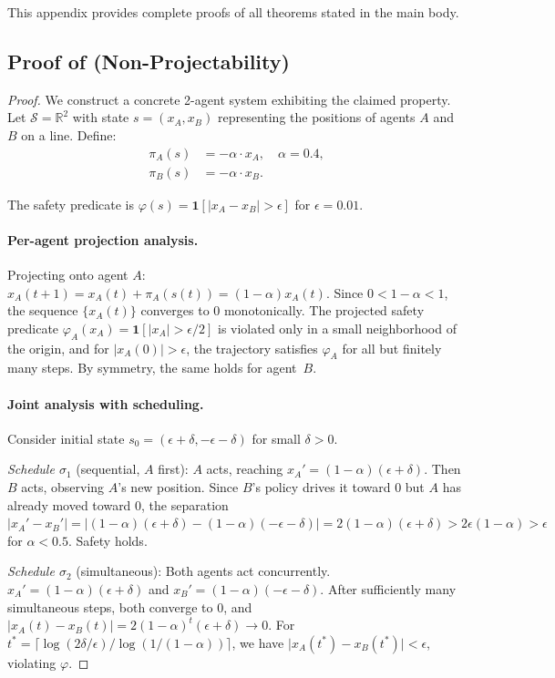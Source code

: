 \documentclass[11pt]{article}
\newcommand{\R}{\mathbb{R}}
\newcommand{\calS}{\mathcal{S}}
\newcommand{\abs}[1]{\lvert #1 \rvert}
\begin{document}
This appendix provides complete proofs of all theorems stated in the
main body.

\subsection{Proof of \texorpdfstring{}{Theorem 2.1} (Non-Projectability)}

\begin{proof}
We construct a concrete 2-agent system exhibiting the claimed property.
Let $\calS = \R^2$ with state $s = (x_A, x_B)$ representing the positions
of agents $A$ and $B$ on a line. Define:
\begin{align}
  \pi_A(s) &= -\alpha \cdot x_A, \quad \alpha = 0.4, \\
  \pi_B(s) &= -\alpha \cdot x_B.
\end{align}

The safety predicate is $\varphi(s) = \mathbf{1}[\abs{x_A - x_B} > \epsilon]$
for $\epsilon = 0.01$.

\paragraph{Per-agent projection analysis.}
Projecting onto agent $A$: $x_A(t+1) = x_A(t) + \pi_A(s(t)) = (1-\alpha)x_A(t)$.
Since $0 < 1-\alpha < 1$, the sequence $\{x_A(t)\}$ converges to 0 monotonically.
The projected safety predicate $\varphi_A(x_A) = \mathbf{1}[\abs{x_A} > \epsilon/2]$
is violated only in a small neighborhood of the origin, and for $\abs{x_A(0)} > \epsilon$,
the trajectory satisfies $\varphi_A$ for all but finitely many steps. By symmetry,
the same holds for agent~$B$.

\paragraph{Joint analysis with scheduling.}
Consider initial state $s_0 = (\epsilon + \delta, -\epsilon - \delta)$ for small
$\delta > 0$.

\emph{Schedule $\sigma_1$} (sequential, $A$ first): $A$ acts, reaching
$x_A' = (1-\alpha)(\epsilon + \delta)$. Then $B$ acts, observing $A$'s new position.
Since $B$'s policy drives it toward 0 but $A$ has already moved toward 0, the
separation $\abs{x_A' - x_B'} = \abs{(1-\alpha)(\epsilon + \delta) - (1-\alpha)(-\epsilon - \delta)} = 2(1-\alpha)(\epsilon + \delta) > 2\epsilon(1-\alpha) > \epsilon$
for $\alpha < 0.5$. Safety holds.

\emph{Schedule $\sigma_2$} (simultaneous): Both agents act concurrently.
$x_A' = (1-\alpha)(\epsilon+\delta)$ and $x_B' = (1-\alpha)(-\epsilon-\delta)$.
After sufficiently many simultaneous steps, both converge to 0, and
$\abs{x_A(t) - x_B(t)} = 2(1-\alpha)^t(\epsilon + \delta) \to 0$.
For $t^* = \lceil \log(2\delta/\epsilon) / \log(1/(1-\alpha)) \rceil$,
we have $\abs{x_A(t^*) - x_B(t^*)} < \epsilon$, violating $\varphi$.


\end{proof}
\end{document}
